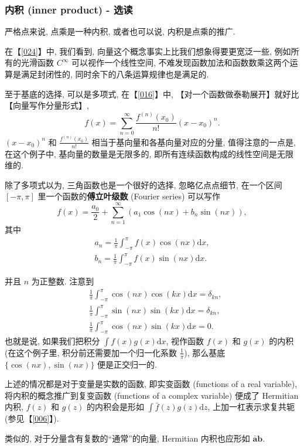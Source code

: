 \subsubsection{内积 (inner product) - 选读}

严格点来说, 点乘是一种内积, 或者也可以说, 内积是点乘的推广.

在【\ref{024}】中, 我们看到, 向量这个概念事实上比我们想象得要更宽泛一些,
例如所有的光滑函数 $C^\infty$ 可以视作一个线性空间,
不难发现函数加法和函数数乘这两个运算是满足封闭性的,
同时余下的八条运算规律也是满足的.

至于基底的选择, 可以是多项式, 在【\ref{016}】中,
【对一个函数做泰勒展开】就好比【向量写作分量形式】, \[
f(x)=\sum_{n=0}^\infty\frac{f^{(n)}(x_0)}{n!}(x-x_0)^n.
\] $(x-x_0)^n$ 和 $\frac{f^{(n)}(x_0)}{n!} $
相当于基向量和各基向量对应的分量, 值得注意的一点是, 在这个例子中,
基向量的数量是无限多的, 即所有连续函数构成的线性空间是无限维的.

除了多项式以为, 三角函数也是一个很好的选择, 忽略亿点点细节, 在一个区间
$[-\pi,\pi]$ 里一个函数的\textbf{傅立叶级数} (Fourier series) 可以写作
\[
f(x)=\frac{a_0}{2}+\sum_{n=1}^\infty\left(a_1\cos(nx)+b_n\sin(nx)\right),
\] 其中 \[
\begin{aligned}
a_n=\frac{1}{\pi}\int_{-\pi}^\pi f(x)\cos(nx)\mathrm{d}x,\\
b_n=\frac{1}{\pi}\int_{-\pi}^\pi f(x)\sin(nx)\mathrm{d}x.
\end{aligned}
\]

并且 $n$ 为正整数. 注意到 \[
\begin{aligned}
&\frac{1}{\pi}\int_{-\pi}^{\pi}\cos(nx)\cos(kx)\mathrm{d}x=\delta_{kn},\\
&\frac{1}{\pi}\int_{-\pi}^{\pi}\sin(nx)\sin(kx)\mathrm{d}x=\delta_{kn},\\
&\frac{1}{\pi}\int _{-\pi}^{\pi}\cos(nx)\sin(kx)\mathrm{d}x=0.
\end{aligned}
\] 也就是说, 如果我们把积分 $\int f(x)g(x)\mathrm{d}x$, 视作函数
$f(x)$ 和 $g(x)$ 的内积 (在这个例子里, 积分前还需要加一个归一化系数
$\frac{1}{\pi}$), 那么基底 $\{\cos(nx),\sin(nx)\}$ 便是正交归一的.

\begin{newquote}
上述的情况都是对于变量是实数的函数, 即实变函数 (functions of a real
variable), 将内积的概念推广到复变函数 (functions of a complex variable)
便成了 Hermitian 内积, $f(z)$ 和 $g(z)$ 的内积会是形如
$\int\bar{f}(z)g(z)\mathrm{d}z$, 上加一杠表示求复共轭 (参见【\ref{006}】).

类似的, 对于分量含有复数的``通常''的向量, Hermitian 内积也应形如
$\bar{\boldsymbol{a}}\boldsymbol{b}$.
\end{newquote}

